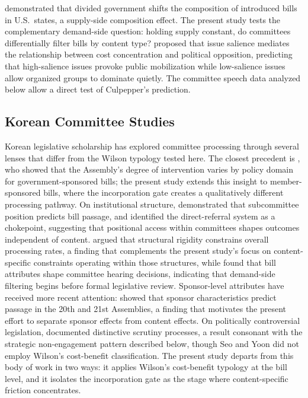 \documentclass[11pt]{article}
\begin{document}
\citet{craig2023} demonstrated that divided government shifts the composition of introduced bills in U.S.\ states, a supply-side composition effect. The present study tests the complementary demand-side question: holding supply constant, do committees differentially filter bills by content type? \citet{culpepper2011} proposed that issue salience mediates the relationship between cost concentration and political opposition, predicting that high-salience issues provoke public mobilization while low-salience issues allow organized groups to dominate quietly. The committee speech data analyzed below allow a direct test of Culpepper's prediction.

\subsection{Korean Committee Studies}

Korean legislative scholarship has explored committee processing through several lenses that differ from the Wilson typology tested here. The closest precedent is \citet{lee2021}, who showed that the Assembly's degree of intervention varies by policy domain for government-sponsored bills; the present study extends this insight to member-sponsored bills, where the incorporation gate creates a qualitatively different processing pathway. On institutional structure, \citet{kim2023} demonstrated that subcommittee position predicts bill passage, and \citet{park2026} identified the direct-referral system as a chokepoint, suggesting that positional access within committees shapes outcomes independent of content. \citet{kim2026} argued that structural rigidity constrains overall processing rates, a finding that complements the present study's focus on content-specific constraints operating within those structures, while \citet{kim2019} found that bill attributes shape committee hearing decisions, indicating that demand-side filtering begins before formal legislative review. Sponsor-level attributes have received more recent attention: \citet{an2025} showed that sponsor characteristics predict passage in the 20th and 21st Assemblies, a finding that motivates the present effort to separate sponsor effects from content effects. On politically controversial legislation, \citet{seo2020} documented distinctive scrutiny processes, a result consonant with the strategic non-engagement pattern described below, though Seo and Yoon did not employ Wilson's cost-benefit classification. The present study departs from this body of work in two ways: it applies Wilson's cost-benefit typology at the bill level, and it isolates the incorporation gate as the stage where content-specific friction concentrates.
\end{document}
